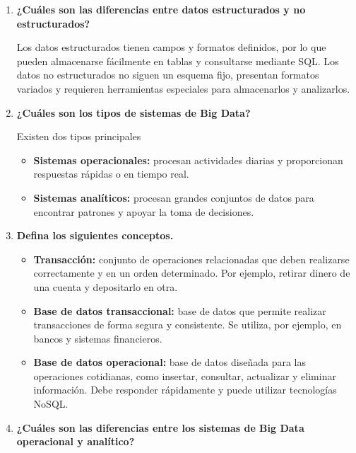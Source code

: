 \begin{enumerate}
Estos tres tipos pueden formar parte de un sistema de Big Data

\item \textbf{¿Cuáles son las diferencias entre datos estructurados y no estructurados?}

Los datos estructurados tienen campos y formatos definidos, por lo que pueden almacenarse fácilmente en tablas y consultarse mediante SQL. Los datos no estructurados no siguen un esquema fijo, presentan formatos variados y requieren herramientas especiales para almacenarlos y analizarlos.

\item \textbf{¿Cuáles son los tipos de sistemas de Big Data?}

Existen dos tipos principales

\begin{itemize}
    \item \textbf{Sistemas operacionales:} procesan actividades diarias y proporcionan respuestas rápidas o en tiempo real.
    \item \textbf{Sistemas analíticos:} procesan grandes conjuntos de datos para encontrar patrones y apoyar la toma de decisiones.
\end{itemize}

\item \textbf{Defina los siguientes conceptos.}

\begin{itemize}
    \item[a)] \textbf{Transacción:} conjunto de operaciones relacionadas que deben realizarse correctamente y en un orden determinado. Por ejemplo, retirar dinero de una cuenta y depositarlo en otra.

    \item[b)] \textbf{Base de datos transaccional:} base de datos que permite realizar transacciones de forma segura y consistente. Se utiliza, por ejemplo, en bancos y sistemas financieros.

    \item[c)] \textbf{Base de datos operacional:} base de datos diseñada para las operaciones cotidianas, como insertar, consultar, actualizar y eliminar información. Debe responder rápidamente y puede utilizar tecnologías NoSQL.
\end{itemize}


\item \textbf{¿Cuáles son las diferencias entre los sistemas de Big Data operacional y analítico?}


\end{enumerate}
